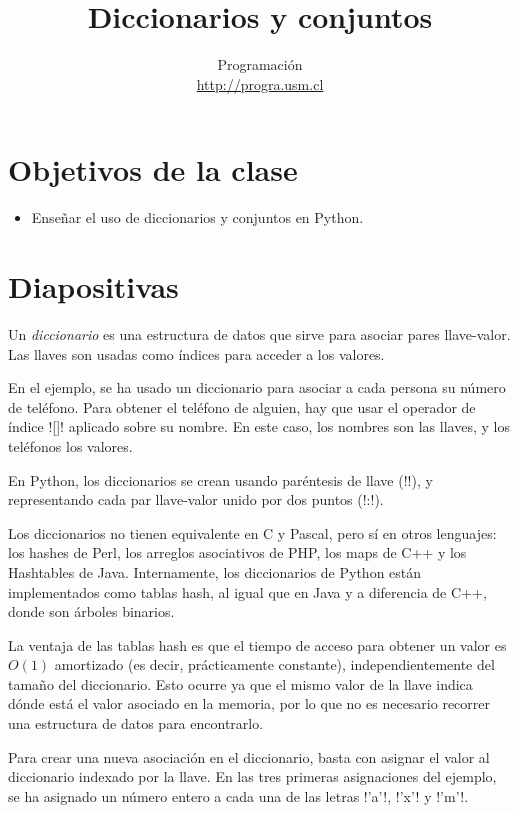 \documentclass[10pt]{article}
\title{Diccionarios y conjuntos}
\author{Programación \\ \url{http://progra.usm.cl}}
\date{}
\begin{document}
  \maketitle

  \section*{Objetivos de la clase}
  \begin{itemize}
    \item Enseñar el uso de diccionarios y conjuntos en Python.
  \end{itemize}

  \section*{Diapositivas}


  Un \emph{diccionario} es una estructura de datos
  que sirve para asociar pares llave-valor.
  Las llaves son usadas como índices
  para acceder a los valores.

  En el ejemplo,
  se ha usado un diccionario
  para asociar a cada persona su número de teléfono.
  Para obtener el teléfono de alguien,
  hay que usar el operador de índice \li![]!
  aplicado sobre su nombre.
  En este caso,
  los nombres son las llaves,
  y los teléfonos los valores.

  En Python, los diccionarios se crean usando paréntesis de llave (\li!{}!),
  y representando cada par llave-valor unido por dos puntos (\li!:!).

  Los diccionarios no tienen equivalente en C y Pascal,
  pero sí en otros lenguajes:
  los hashes de Perl,
  los arreglos asociativos de PHP,
  los maps de C++
  y los Hashtables de Java.
  Internamente,
  los diccionarios de Python están implementados como tablas hash,
  al igual que en Java y a diferencia de C++, donde son árboles binarios.

  La ventaja de las tablas hash
  es que el tiempo de acceso para obtener un valor es \(O(1)\) amortizado
  (es decir, prácticamente constante),
  independientemente del tamaño del diccionario.
  Esto ocurre ya que el mismo valor de la llave
  indica dónde está el valor asociado en la memoria,
  por lo que no es necesario recorrer una estructura de datos
  para encontrarlo.


  Para crear una nueva asociación en el diccionario,
  basta con asignar el valor al diccionario indexado por la llave.
  En las tres primeras asignaciones del ejemplo,
  se ha asignado un número entero
  a cada una de las letras \li!'a'!, \li!'x'! y \li!'m'!.
\end{document}
